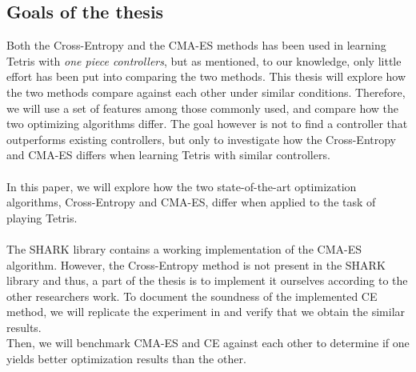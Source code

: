 \subsection{Goals of the thesis \label{section:GoalOfTheThesis}}

Both the Cross-Entropy and the CMA-ES methods has been used 
in learning Tetris with \textit{one piece controllers}, but as 
mentioned, to our knowledge, only little effort has been put into 
comparing the two methods. This thesis will explore
how the two methods compare against each other under similar
conditions. Therefore, we will use a set of features among those
commonly used, and compare how the two optimizing algorithms 
differ. The goal however is not to find a controller that 
outperforms existing controllers, but only to investigate 
how the Cross-Entropy and CMA-ES differs when learning Tetris
with similar controllers.\\
\\
In this paper, we will explore how the two state-of-the-art
optimization algorithms, Cross-Entropy and CMA-ES, differ when 
applied to the task of playing Tetris.\\
\\
The SHARK library \citep{shark08} contains a
working implementation of the CMA-ES 
algorithm. However, the Cross-Entropy method 
is not present in the SHARK library and thus, 
a part of the thesis is to implement it ourselves according to 
the other researchers work. To document the 
soundness of the implemented CE method, 
we will replicate the experiment in \citep{thiery:09} and 
verify that we obtain the similar results.\\
Then, we will benchmark CMA-ES and CE against each other 
to determine if one yields better optimization results than the other.
